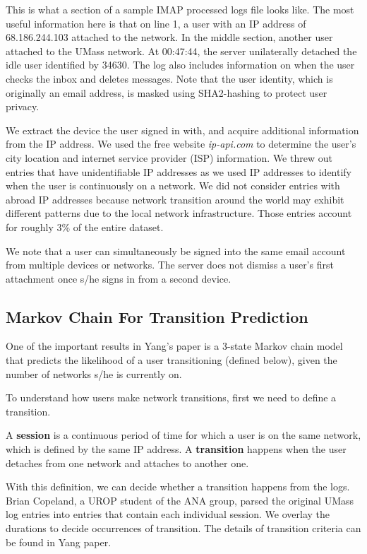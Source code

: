 \documentclass[]{article}
\newenvironment{definition}[1][Definition]{\begin{trivlist}
\item[\hskip \labelsep {\bfseries #1}]}{\end{trivlist}}
\begin{document}
This is what a section of a sample IMAP processed logs file looks like. The most useful information here is that on line 1, a user with an IP address of 68.186.244.103 attached to the network. In the middle section, another user attached to the UMass network. At 00:47:44, the server unilaterally detached the idle user identified by 34630. The log also includes information on when the user checks the inbox and deletes messages. Note that the user identity, which is originally an email address, is masked using SHA2-hashing \cite{yang} to protect user privacy. 

We extract the device the user signed in with, and acquire additional information from the IP address. We used the free website \textit{ip-api.com} to determine the user's city location and internet service provider (ISP) information. We threw out entries that have unidentifiable IP addresses as we used IP addresses to identify when the user is continuously on a network. We did not consider entries with abroad IP addresses because network transition around the world may exhibit different patterns due to the local network infrastructure. Those entries account for roughly 3\% of the entire dataset. 

We note that a user can simultaneously be signed into the same email account from multiple devices or networks. The server does not dismiss a user's first attachment once s/he signs in from a second device.


\subsection{Markov Chain For Transition Prediction}
One of the important results in Yang's paper is a 3-state Markov chain model that predicts the likelihood of a user transitioning (defined below), given the number of networks s/he is currently on.

To understand how users make network transitions, first we need to define a transition.

\begin{definition}
A \textbf{session} is a continuous period of time for which a user is on the same network, which is defined by the same IP address. A \textbf{transition} happens when the user detaches from one network and attaches to another one.
\end{definition}

With this definition, we can decide whether a transition happens from the logs. Brian Copeland, a UROP student of the ANA group, parsed the original UMass log entries into entries that contain each individual session. We overlay the durations to decide occurrences of transition. The details of transition criteria can be found in Yang \cite{yang} paper.
\end{document}
